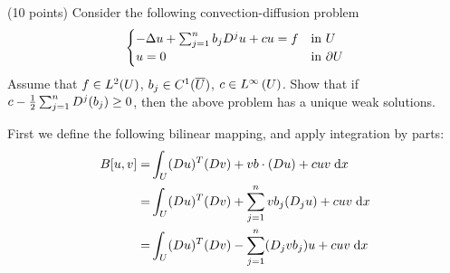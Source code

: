 (10 points)
Consider the following convection-diffusion problem
\begin{align*}
  \begin{cases}
    -\Delta u + \sum_{j = 1}^{n} b_j D^{j}{} u + c u = f & \text{in } U\\
    u = 0 & \text{in } \partial U
  \end{cases}
\end{align*}
Assume that $f \in L^2(U)$, $b_j \in C^1(\overline{U})$,
$c \in L^{\infty}\left(U \right)$.
Show that if $c - \frac{1}{2} \sum_{j = 1}^{n} D^{j}{}(b_j) \geq 0$,
then the above problem has a unique weak solutions.

First we define the following bilinear mapping, and apply integration by parts:
\begin{align*}
  B[u, v] = &\int_{U} (D u)^T (D v) + v b \cdot (D u) + c u v \;\mathrm{d}x\\
          = &\int_{U} (D u)^T (D v) + \sum_{j = 1}^n v b_j (D_j u) + c u v \;\mathrm{d}x\\
          = &\int_{U} (D u)^T (D v) - \sum_{j = 1}^n (D_j v b_j) u + c u v \;\mathrm{d}x
\end{align*}

